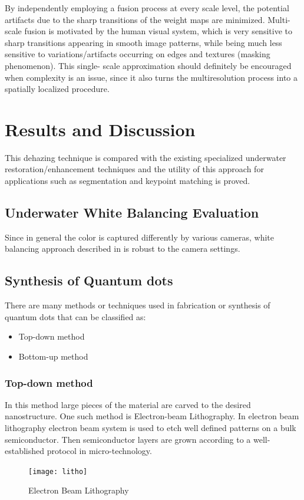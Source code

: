 \documentclass[hidelinks, 12pt]{report}
\begin{document}
By independently employing a fusion process at every scale level, the potential artifacts due to the sharp transitions of the weight maps are minimized. Multi-scale fusion is motivated by the human visual system, which is very sensitive to sharp transitions appearing in smooth image patterns, while being much less sensitive to variations/artifacts occurring on edges and textures (masking phenomenon). This single- scale approximation should definitely be encouraged when complexity is an issue, since it also turns the multiresolution process into a spatially localized procedure.

\chapter{Results and Discussion}
This dehazing technique is compared with the existing specialized underwater restoration/enhancement techniques and the utility of this approach for applications such as segmentation and keypoint matching is proved.
\section{Underwater White Balancing Evaluation}
Since in general the color is captured differently by various cameras,  white balancing approach described in is robust to the camera settings.

\section{Synthesis of Quantum dots}
There are many methods or techniques used in fabrication or synthesis of quantum dots that can be classified as:
\begin{itemize}
\item{Top-down method}
\item{Bottom-up method}
\end{itemize}
\subsection*{Top-down method}
In this method large pieces of the material are carved to the desired nanostructure. One such method is Electron-beam Lithography. In electron beam lithography electron beam system is used to etch well defined patterns on a bulk semiconductor. Then semiconductor layers are grown according to a well- established protocol in micro-technology. 
\begin{figure}[H]
\centering
\texttt{[image: litho]}
\caption[Electron Beam Lithography]{Electron Beam Lithography \cite{syn}}
\label{Electron Beam Lithography}
\end{figure}
\end{document}
